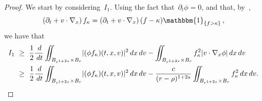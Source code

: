 \documentclass[leqno,10pt]{amsart}
\theoremstyle{plain}
\theoremstyle{remark}
\numberwithin{equation}{section}
\def\dx{\,{\rm d}x}
\def\dv{\,{\rm d}v}
\def\dt{\,{\rm d}t}
\def \d{\,{\rm d}}
\newcommand{\snr}[1]{\lvert #1\rvert}
\newcommand{\kk}{\kappa}
\begin{document}
{\begin{proof}
	We start by considering~$I_1$. Using the fact  that~$\partial_t\phi=0$, and that, by~\cite[Formula (A8)]{IS20}, 
	\begin{equation}\label{eq:transport-truncation}
		(\partial_t + v\cdot \nabla_x)\,f_\kk=
		(\partial_t + v\cdot \nabla_x)\,(f-\kk)\mathbbm{1}_{\{f>\kk\}}\,,
    \end{equation}
    we have that
	\begin{equation}\label{mancava} 
    \begin{aligned}
		I_1 & \ \geq  \ \frac{1}{2}\frac{\d}{\dt} \iint_{B_{{{r}}^{1+2s}}\times B_{{r}}} \snr{(\phi f_\kk){(t,x,v)}}^2  \dx\dv - \iint_{B_{{{r}}^{1+2s}}\times B_{{r}}}f_\kk^2\snr{v\cdot \nabla_x \phi}\dx\dv \\
		& \ \geq \  \frac{1}{2}\frac{\d}{\dt} \iint_{B_{{{r}}^{1+2s}}\times B_{{r}}} \snr{ (\phi f_\kk){(t,x,v)}}^2  \dx\dv - \frac{c}{({r}-{\rho})^{1+2s}}\iint_{B_{{{r}}^{1+2s}}\times B_{{r}}} f_\kk^2\dx\dv.
    \end{aligned}
	\end{equation}
	

\end{proof}}
\end{document}

